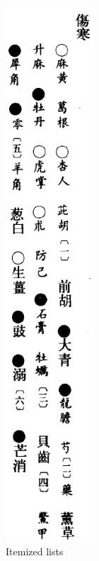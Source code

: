 \documentclass[fontsize=11pt, paper=a4, 
  DIV15,
  normalheadings,
  parskip=half-, 
  pointlessnumbers]{scrartcl}
\begin{document}
\begin{figure}[h]
\begin{minipage}[b]{5 cm}
\begin{centering}
    \includegraphics[height=20cm]{image4}
    \caption{Itemized lists}
    \label{fig4}
    \end{centering}
  \end{minipage}
\end{figure}
\end{document}
